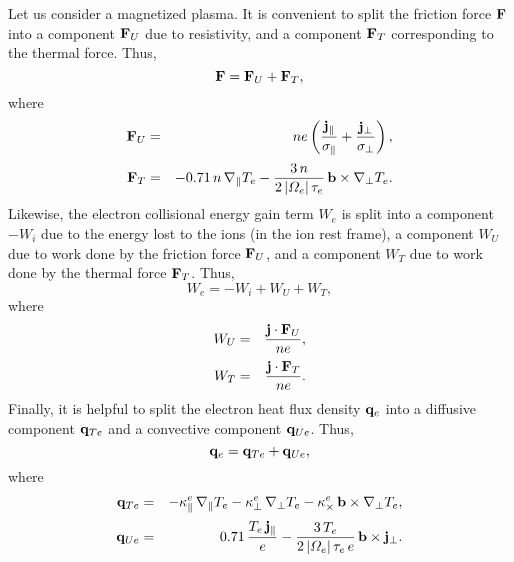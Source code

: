 Let us consider a magnetized plasma. It is convenient to split the friction force
${\bf F}$ into a component ${\bf F}_U$ due to resistivity, and a
component ${\bf F}_T$ corresponding to the thermal force. Thus,
\begin{equation}
{\bf F} = {\bf F}_U+{\bf F}_T,
\end{equation}
where\begin{eqnarray}
{\bf F}_U&=& ne\left(\frac{{\bf j}_\parallel}{\sigma_\parallel}
+\frac{{\bf j}_\perp}{\sigma_\perp}\right), \\[0.5ex]
{\bf F}_T &=& - 0.71\,n\,\nabla_\parallel T_e
-\frac{3\,n}{2\,|{\mit\Omega}_e|\,\tau_e}\,{\bf b}\times\nabla_\perp T_e.
\end{eqnarray}
Likewise, the electron collisional energy gain term $W_e$ is split
into a component $-W_i$ due to the energy lost to the ions (in the
ion rest frame), a component $W_U$ due to work done by the friction
force ${\bf F}_U$, and a component $W_T$ due to work done by the
thermal force ${\bf F}_T$. Thus,
\begin{equation}
W_e = -W_i + W_U + W_T,
\end{equation}
where
\begin{eqnarray}
W_U &=& \frac{{\bf j}\cdot{\bf F}_U}{ne},\\[0.5ex]
W_T&=& \frac{{\bf j}\cdot{\bf F}_T}{ne}.
\end{eqnarray}
Finally, it is helpful to split the electron heat flux density ${\bf q}_e$ into
a diffusive component ${\bf q}_{Te}$ and a convective component ${\bf q}_{Ue}$. 
Thus,
\begin{equation}
{\bf q}_e = {\bf q}_{Te} + {\bf q}_{Ue},
\end{equation}
where
\begin{eqnarray}
{\bf q}_{Te} &=&-\kappa_\parallel^e\,\nabla_\parallel T_e -\kappa_\perp^e\,
\nabla_\perp T_e
-\kappa_\times^e\,{\bf b}\times\nabla_\perp T_e,\\[0.5ex]
{\bf q}_{Ue}&=&  0.71\,\frac{T_e\,{\bf j}_\parallel}{e}-
\frac{3\,T_e}{2\,|{\mit\Omega}_e|\,\tau_e\,e}\,{\bf b}\times{\bf j}_\perp.
\end{eqnarray}


